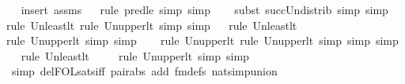 \begin{isabellebody}
\ \ \isamarkupfalse%
{\isacharparenleft}{\kern0pt}insert\ assms{\isacharparenright}{\kern0pt}\isanewline
\ \ \isamarkupfalse%
{\isacharparenleft}{\kern0pt}rule\ pred{\isacharunderscore}{\kern0pt}le{\isacharcomma}{\kern0pt}\ simp{\isacharcomma}{\kern0pt}\ simp{\isacharparenright}{\kern0pt}{\isacharplus}{\kern0pt}\ \isanewline
\ \ \isamarkupfalse%
{\isacharparenleft}{\kern0pt}subst\ succ{\isacharunderscore}{\kern0pt}Un{\isacharunderscore}{\kern0pt}distrib{\isacharcomma}{\kern0pt}\ simp{\isacharcomma}{\kern0pt}\ simp{\isacharparenright}{\kern0pt}{\isacharplus}{\kern0pt}\isanewline
\ \ \isamarkupfalse%
{\isacharparenleft}{\kern0pt}rule\ Un{\isacharunderscore}{\kern0pt}least{\isacharunderscore}{\kern0pt}lt{\isacharcomma}{\kern0pt}\ rule\ Un{\isacharunderscore}{\kern0pt}upper{}{\isacharunderscore}{\kern0pt}lt{\isacharcomma}{\kern0pt}\ simp{\isacharcomma}{\kern0pt}\ simp{\isacharparenright}{\kern0pt}\isanewline
\ \ \isamarkupfalse%
{\isacharparenleft}{\kern0pt}rule\ Un{\isacharunderscore}{\kern0pt}least{\isacharunderscore}{\kern0pt}lt{\isacharparenright}{\kern0pt}{\isacharplus}{\kern0pt}\isanewline
\ \ \ \ \isamarkupfalse%
{\isacharparenleft}{\kern0pt}rule\ Un{\isacharunderscore}{\kern0pt}upper{}{\isacharunderscore}{\kern0pt}lt{\isacharcomma}{\kern0pt}\ simp{\isacharcomma}{\kern0pt}\ simp{\isacharparenright}{\kern0pt}\isanewline
\ \ \ \isamarkupfalse%
{\isacharparenleft}{\kern0pt}rule\ Un{\isacharunderscore}{\kern0pt}upper{}{\isacharunderscore}{\kern0pt}lt{\isacharcomma}{\kern0pt}\ rule\ Un{\isacharunderscore}{\kern0pt}upper{}{\isacharunderscore}{\kern0pt}lt{\isacharcomma}{\kern0pt}\ simp{\isacharcomma}{\kern0pt}\ simp{\isacharcomma}{\kern0pt}\ simp{\isacharparenright}{\kern0pt}\isanewline
\ \ \isamarkupfalse%
{\isacharparenleft}{\kern0pt}rule\ Un{\isacharunderscore}{\kern0pt}least{\isacharunderscore}{\kern0pt}lt{\isacharparenright}{\kern0pt}{\isacharplus}{\kern0pt}\isanewline
\ \ \ \ \isamarkupfalse%
{\isacharparenleft}{\kern0pt}rule\ Un{\isacharunderscore}{\kern0pt}upper{}{\isacharunderscore}{\kern0pt}lt{\isacharcomma}{\kern0pt}\ simp{\isacharcomma}{\kern0pt}\ simp{\isacharparenright}{\kern0pt}{\isacharplus}{\kern0pt}\isanewline
\ \ \isamarkupfalse%
\ {\isacharparenleft}{\kern0pt}simp\ del{\isacharcolon}{\kern0pt}FOL{\isacharunderscore}{\kern0pt}sats{\isacharunderscore}{\kern0pt}iff\ pair{\isacharunderscore}{\kern0pt}abs\ add{\isacharcolon}{\kern0pt}\ fm{\isacharunderscore}{\kern0pt}defs\ nat{\isacharunderscore}{\kern0pt}simp{\isacharunderscore}{\kern0pt}union{\isacharparenright}{\kern0pt}\isanewline

\end{isabellebody}

